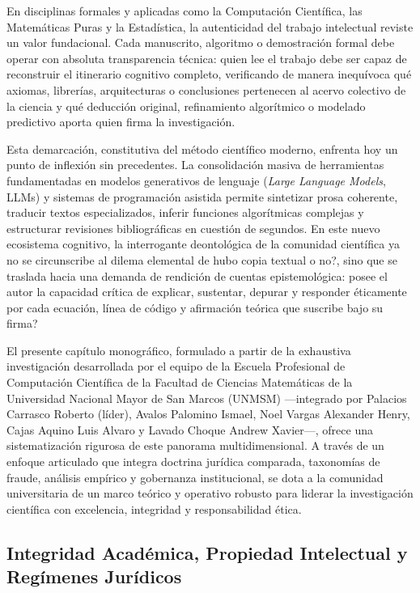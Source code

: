 En disciplinas formales y aplicadas como la Computación Científica, las Matemáticas Puras y la Estadística, la autenticidad del trabajo intelectual reviste un valor fundacional. Cada manuscrito, algoritmo o demostración formal debe operar con absoluta transparencia técnica: quien lee el trabajo debe ser capaz de reconstruir el itinerario cognitivo completo, verificando de manera inequívoca qué axiomas, librerías, arquitecturas o conclusiones pertenecen al acervo colectivo de la ciencia y qué deducción original, refinamiento algorítmico o modelado predictivo aporta quien firma la investigación.

Esta demarcación, constitutiva del método científico moderno, enfrenta hoy un punto de inflexión sin precedentes. La consolidación masiva de herramientas fundamentadas en modelos generativos de lenguaje (\textit{Large Language Models}, LLMs) y sistemas de programación asistida permite sintetizar prosa coherente, traducir textos especializados, inferir funciones algorítmicas complejas y estructurar revisiones bibliográficas en cuestión de segundos. En este nuevo ecosistema cognitivo, la interrogante deontológica de la comunidad científica ya no se circunscribe al dilema elemental de \textquestiondown hubo copia textual o no?, sino que se traslada hacia una demanda de rendición de cuentas epistemológica: \textquestiondown posee el autor la capacidad crítica de explicar, sustentar, depurar y responder éticamente por cada ecuación, línea de código y afirmación teórica que suscribe bajo su firma?

El presente capítulo monográfico, formulado a partir de la exhaustiva investigación desarrollada por el equipo de la Escuela Profesional de Computación Científica de la Facultad de Ciencias Matemáticas de la Universidad Nacional Mayor de San Marcos (UNMSM) ---integrado por Palacios Carrasco Roberto (líder), Avalos Palomino Ismael, Noel Vargas Alexander Henry, Cajas Aquino Luis Alvaro y Lavado Choque Andrew Xavier---, ofrece una sistematización rigurosa de este panorama multidimensional. A través de un enfoque articulado que integra doctrina jurídica comparada, taxonomías de fraude, análisis empírico y gobernanza institucional, se dota a la comunidad universitaria de un marco teórico y operativo robusto para liderar la investigación científica con excelencia, integridad y responsabilidad ética.

\subsection{Integridad Académica, Propiedad Intelectual y Regímenes Jurídicos}

